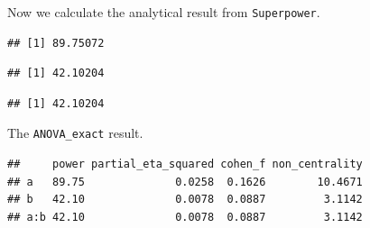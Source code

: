 \documentclass[]{book}
\newenvironment{Shaded}{\begin{snugshade}}{\end{snugshade}}
\newcommand{\DataTypeTok}[1]{\textcolor[rgb]{0.13,0.29,0.53}{#1}}
\newcommand{\KeywordTok}[1]{\textcolor[rgb]{0.13,0.29,0.53}{\textbf{#1}}}
\newcommand{\NormalTok}[1]{#1}
\newcommand{\OperatorTok}[1]{\textcolor[rgb]{0.81,0.36,0.00}{\textbf{#1}}}
\newcommand{\OtherTok}[1]{\textcolor[rgb]{0.56,0.35,0.01}{#1}}
\newcommand{\StringTok}[1]{\textcolor[rgb]{0.31,0.60,0.02}{#1}}
\begin{document}
Now we calculate the analytical result from \texttt{Superpower}.

\begin{Shaded}
\end{Shaded}

\begin{verbatim}
## [1] 89.75072
\end{verbatim}

\begin{Shaded}
\end{Shaded}

\begin{verbatim}
## [1] 42.10204
\end{verbatim}

\begin{Shaded}
\end{Shaded}

\begin{verbatim}
## [1] 42.10204
\end{verbatim}

The \texttt{ANOVA\_exact} result.

\begin{Shaded}
\end{Shaded}

\begin{verbatim}
##     power partial_eta_squared cohen_f non_centrality
## a   89.75              0.0258  0.1626        10.4671
## b   42.10              0.0078  0.0887         3.1142
## a:b 42.10              0.0078  0.0887         3.1142
\end{verbatim}
\end{document}
